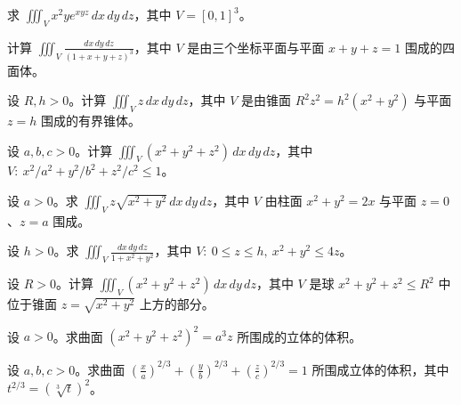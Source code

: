 \newpage
\noindent\begin{minipage}{\textwidth}
求 $\displaystyle\iiint_Vx^2ye^{xyz}\,dx\,dy\,dz$，其中 $V=[0,1]^3$。
\end{minipage}\par\vfill
\noindent\begin{minipage}{\textwidth}
计算 $\displaystyle\iiint_V\frac{dx\,dy\,dz}{(1+x+y+z)^3}$，其中 $V$ 是由三个坐标平面与平面 $x+y+z=1$ 围成的四面体。
\end{minipage}\par\vfill
\noindent\begin{minipage}{\textwidth}
设 $R,h>0$。计算 $\displaystyle\iiint_Vz\,dx\,dy\,dz$，其中 $V$ 是由锥面 $R^2z^2=h^2(x^2+y^2)$ 与平面 $z=h$ 围成的有界锥体。
\end{minipage}\par\vfill
\noindent\begin{minipage}{\textwidth}
设 $a,b,c>0$。计算 $\displaystyle\iiint_V(x^2+y^2+z^2)\,dx\,dy\,dz$，其中 $V:\ x^2/a^2+y^2/b^2+z^2/c^2\le1$。
\end{minipage}\par\vfill
\newpage
\noindent\begin{minipage}{\textwidth}
设 $a>0$。求 $\displaystyle\iiint_Vz\sqrt{x^2+y^2}\,dx\,dy\,dz$，其中 $V$ 由柱面 $x^2+y^2=2x$ 与平面 $z=0$、$z=a$ 围成。
\end{minipage}\par\vfill
\noindent\begin{minipage}{\textwidth}
设 $h>0$。求 $\displaystyle\iiint_V\frac{dx\,dy\,dz}{1+x^2+y^2}$，其中 $V:\ 0\le z\le h,\ x^2+y^2\le4z$。
\end{minipage}\par\vfill
\noindent\begin{minipage}{\textwidth}
设 $R>0$。计算 $\displaystyle\iiint_V(x^2+y^2+z^2)\,dx\,dy\,dz$，其中 $V$ 是球 $x^2+y^2+z^2\le R^2$ 中位于锥面 $z=\sqrt{x^2+y^2}$ 上方的部分。
\end{minipage}\par\vfill
\noindent\begin{minipage}{\textwidth}
设 $a>0$。求曲面 $(x^2+y^2+z^2)^2=a^3z$ 所围成的立体的体积。
\end{minipage}\par\vfill
\newpage
\noindent\begin{minipage}{\textwidth}
设 $a,b,c>0$。求曲面 $\displaystyle\left(\frac xa\right)^{2/3}+\left(\frac yb\right)^{2/3}+\left(\frac zc\right)^{2/3}=1$ 所围成立体的体积，其中 $t^{2/3}=(\sqrt[3]{t})^2$。
\end{minipage}\par\vfill
